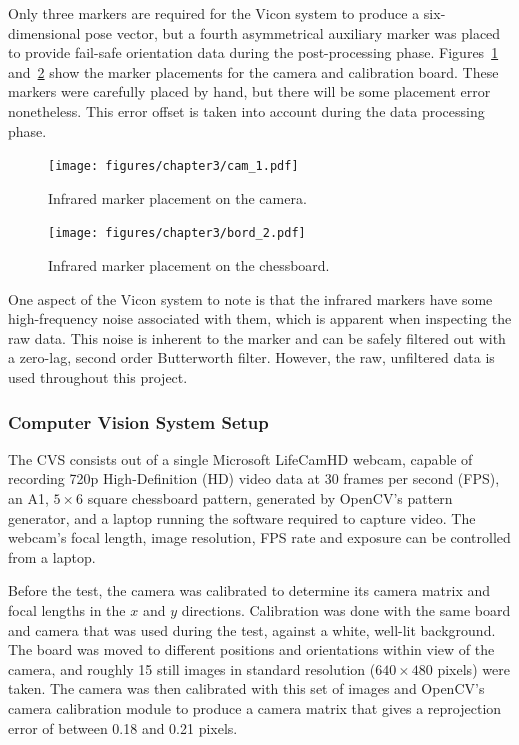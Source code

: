 Only three markers are required for the Vicon system to produce a six-dimensional pose vector, but a fourth asymmetrical auxiliary marker was placed to provide fail-safe orientation data during the post-processing phase. Figures~\ref{fig:cam-marker-placement} and~\ref{fig:board-marker-placement} show the marker placements for the camera and calibration board. These markers were carefully placed by hand, but there will be some placement error nonetheless. This error offset is taken into account during the data processing phase. 

\begin{figure}
   \centering 
   \texttt{[image: figures/chapter3/cam\_1.pdf]}
   \caption{Infrared marker placement on the camera.}
\label{fig:cam-marker-placement}
\end{figure}

\begin{figure}
   \centering 
   \texttt{[image: figures/chapter3/bord\_2.pdf]}
   \caption{Infrared marker placement on the chessboard.}
\label{fig:board-marker-placement}
\end{figure}

One aspect of the Vicon system to note is that the infrared markers have some high-frequency noise associated with them, which is apparent when inspecting the raw data. This noise is inherent to the marker and can be safely filtered out with a zero-lag, second order Butterworth filter. However, the raw, unfiltered data is used throughout this project. 

\subsubsection{Computer Vision System Setup}

The CVS consists out of a single Microsoft LifeCamHD webcam, capable of recording 720p High-Definition (HD) video data at 30 frames per second (FPS), an A1, $5\times6$ square chessboard pattern, generated by OpenCV's pattern generator, and a laptop running the software required to capture video. The webcam's focal length, image resolution, FPS rate and exposure can be controlled from a laptop. 

Before the test, the camera was calibrated to determine its camera matrix and focal lengths in the $x$ and $y$ directions. Calibration was done with the same board and camera that was used during the test, against a white, well-lit background. The board was moved to different positions and orientations within view of the camera, and roughly 15 still images in standard resolution ($640\times480$ pixels) were taken. The camera was then calibrated with this set of images and OpenCV's camera calibration module to produce a camera matrix that gives a reprojection error of between 0.18 and 0.21 pixels. 

